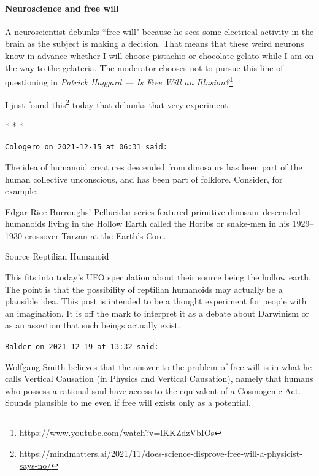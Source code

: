 \paragraph{Neuroscience and free will}
A neuroscientist debunks ``free will" because he sees some electrical activity in the brain as the subject is making a decision. That means that these weird neurons know in advance whether I will choose pistachio or chocolate gelato while I am on the way to the gelateria. The moderator chooses not to pursue this line of questioning in \textit{Patrick Haggard — Is Free Will an Illusion?}\footnote{\url{https://www.youtube.com/watch?v=lKKZdzVbIOs}}

I just found this\footnote{\url{https://mindmatters.ai/2021/11/does-science-disprove-free-will-a-physicist-says-no/}} today that debunks that very experiment.


\begin{center}* * *\end{center}

\begin{footnotesize}\begin{sffamily}



\texttt{Cologero on 2021-12-15 at 06:31 said: }

The idea of humanoid creatures descended from dinosaurs has been part of the human collective unconscious, and has been part of folklore. Consider, for example:

\begin{quotex}
Edgar Rice Burroughs' Pellucidar series featured primitive dinosaur-descended humanoids living in the Hollow Earth called the Horibs or snake-men in his 1929–1930 crossover Tarzan at the Earth's Core.

\end{quotex}
Source Reptilian Humanoid

This fits into today's UFO speculation about their source being the hollow earth. The point is that the possibility of reptilian humanoids may actually be a plausible idea. This post is intended to be a thought experiment for people with an imagination. It is off the mark to interpret it as a debate about Darwinism or as an assertion that such beings actually exist.


\hfill

\texttt{Balder on 2021-12-19 at 13:32 said: }

Wolfgang Smith believes that the answer to the problem of free will is in what he calls Vertical Causation (in Physics and Vertical Causation), namely that humans who possess a rational soul have access to the equivalent of a Cosmogenic Act. Sounds plausible to me even if free will exists only as a potential.


\end{sffamily}\end{footnotesize}

